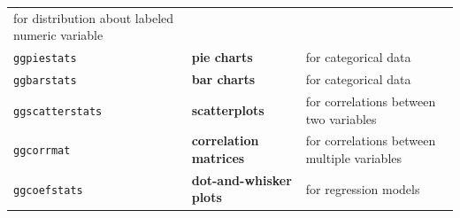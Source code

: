 \documentclass[]{article}
\begin{document}
\begin{longtable}[]{@{}lll@{}}
\begin{minipage}[t]{0.49\columnwidth}
for distribution about labeled numeric variable\strut
\end{minipage}\tabularnewline
\begin{minipage}[t]{0.17\columnwidth}\raggedright
\texttt{ggpiestats}\strut
\end{minipage} & \begin{minipage}[t]{0.25\columnwidth}\raggedright
\textbf{pie charts}\strut
\end{minipage} & \begin{minipage}[t]{0.49\columnwidth}\raggedright
for categorical data\strut
\end{minipage}\tabularnewline
\begin{minipage}[t]{0.17\columnwidth}\raggedright
\texttt{ggbarstats}\strut
\end{minipage} & \begin{minipage}[t]{0.25\columnwidth}\raggedright
\textbf{bar charts}\strut
\end{minipage} & \begin{minipage}[t]{0.49\columnwidth}\raggedright
for categorical data\strut
\end{minipage}\tabularnewline
\begin{minipage}[t]{0.17\columnwidth}\raggedright
\texttt{ggscatterstats}\strut
\end{minipage} & \begin{minipage}[t]{0.25\columnwidth}\raggedright
\textbf{scatterplots}\strut
\end{minipage} & \begin{minipage}[t]{0.49\columnwidth}\raggedright
for correlations between two variables\strut
\end{minipage}\tabularnewline
\begin{minipage}[t]{0.17\columnwidth}\raggedright
\texttt{ggcorrmat}\strut
\end{minipage} & \begin{minipage}[t]{0.25\columnwidth}\raggedright
\textbf{correlation matrices}\strut
\end{minipage} & \begin{minipage}[t]{0.49\columnwidth}\raggedright
for correlations between multiple variables\strut
\end{minipage}\tabularnewline
\begin{minipage}[t]{0.17\columnwidth}\raggedright
\texttt{ggcoefstats}\strut
\end{minipage} & \begin{minipage}[t]{0.25\columnwidth}\raggedright
\textbf{dot-and-whisker plots}\strut
\end{minipage} & \begin{minipage}[t]{0.49\columnwidth}\raggedright
for regression models\strut
\end{minipage}\tabularnewline
\bottomrule
\end{longtable}
\end{document}
